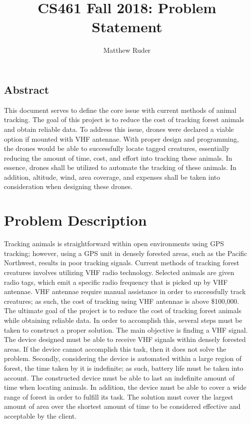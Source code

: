 \documentclass[10pt,journal,draftclsnofoot,onecolumn]{IEEEtran}
\begin{document}
\begin{singlespace}
\begin{titlepage}
\title{CS461 Fall 2018: Problem Statement}
\author{Matthew Ruder}
\maketitle
\section{Abstract}
This document serves to define the core issue with current methods of animal tracking. The goal of this project is to reduce the cost of tracking forest animals and obtain reliable data. To address this issue, drones were declared a viable option if mounted with VHF antennae. With proper design and programming, the drones would be able to successfully locate tagged creatures, essentially reducing the amount of time, cost, and effort into tracking these animals. In essence, drones shall be utilized to automate the tracking of these animals. In addition, altitude, wind, area coverage, and expenses shall be taken into consideration when designing these drones. 
\thispagestyle{empty}
\end{titlepage}




\section{Problem Description}
Tracking animals is straightforward within open environments using GPS tracking; however, using a GPS unit in densely forested areas, such as the Pacific Northwest, results in poor tracking signals. Current methods of tracking forest creatures involves utilizing VHF radio technology. Selected animals are given radio tags, which emit a specific radio frequency that is picked up by VHF antennae. VHF antennae require manual assistance in order to successfully track creatures; as such, the cost of tracking using VHF antennae is above \$100,000. The ultimate goal of the project is to reduce the cost of tracking forest animals while obtaining reliable data. In order to accomplish this, several steps must be taken to construct a proper solution. The main objective is finding a VHF signal. The device designed must be able to receive VHF signals within densely forested areas. If the device cannot accomplish this task, then it does not solve the problem. Secondly, considering the device is automated within a large region of forest, the time taken by it is indefinite; as such, battery life must be taken into account. The constructed device must be able to last an indefinite amount of time when locating animals. In addition, the device must be able to cover a wide range of forest in order to fulfill its task. The solution must cover the largest amount of area over the shortest amount of time to be considered effective and acceptable by the client.


\end{singlespace}
\end{document}
